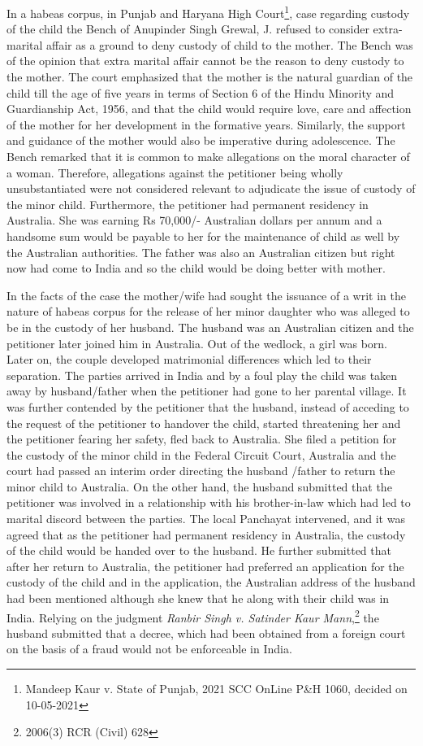 \begin{multicols}{2}
\noi
In a habeas corpus, in Punjab and Haryana High Court\footnote{Mandeep Kaur v. State of Punjab, 2021 SCC OnLine P\&H 1060, decided on 10-05-2021}, case regarding custody of the child the Bench of Anupinder Singh Grewal, J. refused to consider extra-marital affair as a ground to deny custody of child to the mother. The Bench was of the opinion that extra marital affair cannot be
the reason to deny custody to the mother. The court emphasized that the mother is the natural
guardian of the child till the age of five years in terms of Section 6 of the Hindu Minority and
Guardianship Act, 1956, and that the child would require love, care and affection of the mother
for her development in the formative years. Similarly, the support and guidance of the mother
would also be imperative during adolescence. The Bench remarked that it is common to make
allegations on the moral character of a woman. Therefore, allegations against the petitioner being
wholly unsubstantiated were not considered relevant to adjudicate the issue of custody of the
minor child. Furthermore, the petitioner had permanent residency in Australia. She was earning
Rs 70,000/- Australian dollars per annum and a handsome sum would be payable to her for the
maintenance of child as well by the Australian authorities. The father was also an Australian
citizen but right now had come to India and so the child would be doing better with mother.

\noi
In the facts of the case the mother/wife had sought the issuance of a writ in the nature of habeas
corpus for the release of her minor daughter who was alleged to be in the custody of her husband.
The husband was an Australian citizen and the petitioner later joined him in Australia. Out of the
wedlock, a girl was born. Later on, the couple developed matrimonial differences which led to
their separation. The parties arrived in India and by a foul play the child was taken away by
husband/father when the petitioner had gone to her parental village. It was further contended by
the petitioner that the husband, instead of acceding to the request of the petitioner to handover the
child, started threatening her and the petitioner fearing her safety, fled back to Australia. She filed
a petition for the custody of the minor child in the Federal Circuit Court, Australia and the court
had passed an interim order directing the husband /father to return the minor child to Australia.
On the other hand, the husband submitted that the petitioner was involved in a relationship with 
his brother-in-law which had led to marital discord between the parties. The local Panchayat
intervened, and it was agreed that as the petitioner had permanent residency in Australia, the
custody of the child would be handed over to the husband. He further submitted that after her
return to Australia, the petitioner had preferred an application for the custody of the child and in
the application, the Australian address of the husband had been mentioned although she knew
that he along with their child was in India. Relying on the judgment \textit{Ranbir Singh v. Satinder
Kaur Mann},\footnote{2006(3) RCR (Civil) 628} the husband submitted that a decree, which had been obtained from a foreign court on the basis of a fraud would not be enforceable in India.


\end{multicols}
